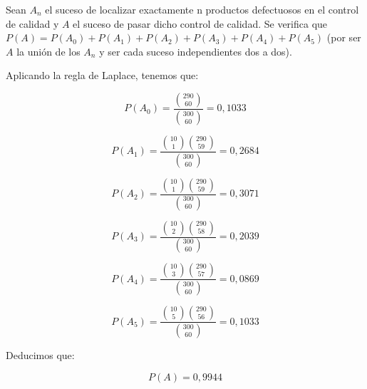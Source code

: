 \problem
Sean $A_n$ el suceso de localizar exactamente n productos defectuosos en el control de calidad y $A$ el suceso de pasar dicho control de calidad. Se verifica que $P(A)=P(A_0)+P(A_1)+P(A_2)+P(A_3)+P(A_4)+P(A_5)$ (por ser $A$ la unión de los $A_n$ y ser cada suceso independientes dos a dos). 
	
	Aplicando la regla de Laplace, tenemos que:
	
	$$P(A_0)=\frac{{290 \choose 60}} {{300 \choose 60}} = 0,1033$$
	
	$$P(A_1)=\frac{{10 \choose 1}{290 \choose 59}} {{300 \choose 60}} = 0,2684$$
	
	$$P(A_2)=\frac{{10 \choose 1}{290 \choose 59}} {{300 \choose 60}} = 0,3071$$
	
	$$P(A_3)=\frac{{10 \choose 2}{290 \choose 58}} {{300 \choose 60}} = 0,2039$$
	
	$$P(A_4)=\frac{{10 \choose 3}{290 \choose 57}} {{300 \choose 60}} = 0,0869$$
	
	$$P(A_5)=\frac{{10 \choose 5}{290 \choose 56}} {{300 \choose 60}} = 0,1033$$
	
	Deducimos que:
	
	$$P(A) = 0,9944$$